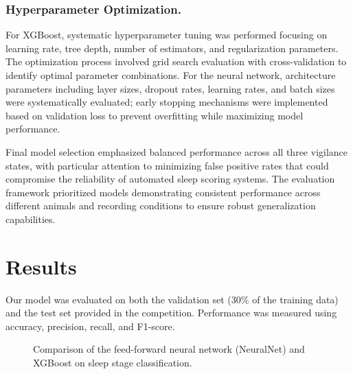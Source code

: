 \documentclass[letterpaper]{article} %
\begin{document}
\subsubsection{Hyperparameter Optimization.}
For XGBoost, systematic hyperparameter tuning was performed focusing on learning rate, tree depth, number of estimators, and regularization parameters. The optimization process involved grid search evaluation with cross-validation to identify optimal parameter combinations. For the neural network, architecture parameters including layer sizes, dropout rates, learning rates, and batch sizes were systematically evaluated; early stopping mechanisms were implemented based on validation loss to prevent overfitting while maximizing model performance.

Final model selection emphasized balanced performance across all three vigilance states, with particular attention to minimizing false positive rates that could compromise the reliability of automated sleep scoring systems. The evaluation framework prioritized models demonstrating consistent performance across different animals and recording conditions to ensure robust generalization capabilities.

\section{Results}

Our model was evaluated on both the validation set (30\% of the training data) and the test set provided in the competition. Performance was measured using accuracy, precision, recall, and F1-score.

\begin{figure}[t]
\centering
{}
\caption{Comparison of the feed-forward neural network (NeuralNet) and XGBoost on sleep stage classification.}
\label{fig:barchart}
\end{figure}
\end{document}
